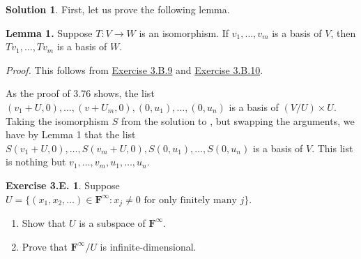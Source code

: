 \documentclass[12pt]{article}
\theoremstyle{definition}
\theoremstyle{exercise}
\newtheorem{exercise}{Exercise 3.E.}
\theoremstyle{solution}
\newtheorem*{solution}{Solution}
\newcommand{\F}{\mathbf{F}}
\begin{document}
\begin{solution}
    First, let us prove the following lemma.

    \vspace{2mm}

    \noindent \textbf{Lemma 1.} Suppose \( T : V \to W \) is an isomorphism. If \( v_1, \ldots, v_m \) is a basis of \( V \), then \( Tv_1, \ldots, Tv_m \) is a basis of \( W \).

    \vspace{2mm}

    \noindent \textit{Proof.} This follows from \href{https://lew98.github.io/Mathematics/LADR_Section_3_B_Exercises.pdf}{Exercise 3.B.9} and \href{https://lew98.github.io/Mathematics/LADR_Section_3_B_Exercises.pdf}{Exercise 3.B.10}.

    \vspace{2mm}

    As the proof of 3.76 shows, the list \( (v_1 + U, 0), \ldots, (v + U_m, 0), (0, u_1), \ldots, (0, u_n) \) is a basis of \( (V/U) \times U \). Taking the isomorphism \( S \) from the solution to , but swapping the arguments, we have by Lemma 1 that the list \( S(v_1 + U, 0), \ldots, S(v_m + U, 0), S(0, u_1), \ldots, S(0, u_n) \) is a basis of \( V \). This list is nothing but \( v_1, \ldots, v_m, u_1, \ldots, u_n \).
\end{solution}

\begin{exercise}
\label{ex:14}
    Suppose \( U = \{ (x_1, x_2, \ldots) \in \F^{\infty} : x_j \neq 0 \text{ for only finitely many } j \} \).
    \begin{enumerate}
        \item Show that \( U \) is a subspace of \( \F^{\infty} \).

        \item Prove that \( \F^{\infty} / U \) is infinite-dimensional.
    \end{enumerate}
\end{exercise}
\end{document}
